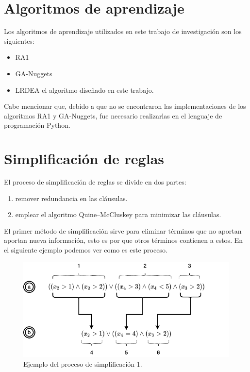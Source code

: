 \section{Algoritmos de aprendizaje}
Los algoritmos de aprendizaje utilizados en este trabajo de investigación son los siguientes:
\begin{itemize}
	\item RA1
	\item GA-Nuggets
	\item LRDEA el algoritmo diseñado en este trabajo.
\end{itemize}

Cabe mencionar que, debido a que no se encontraron las implementaciones de los algoritmos RA1 y GA-Nuggets, fue necesario realizarlas en el lenguaje de programación Python.

\section{Simplificación de reglas}

El proceso de simplificación de reglas se divide en dos partes:
\begin{enumerate}
	\item remover redundancia en las cláusulas.
	\item emplear el algoritmo Quine–McCluskey para minimizar las cláusulas.
\end{enumerate}

El primer método de simplificación sirve para eliminar términos que no aportan aportan nueva información, esto es por que otros términos contienen a estos. En el siguiente ejemplo podemos ver como es este proceso.

\begin{figure}[H]
	\centering
	\includegraphics[width=\linewidth]{fig/clausulas}
	\caption{Ejemplo del proceso de simplificación 1.}
	\label{fig:simp1}
\end{figure}

